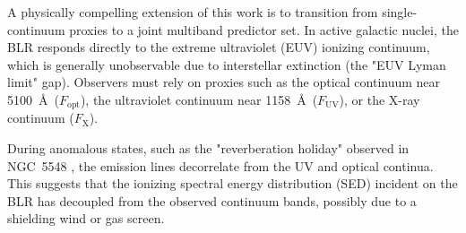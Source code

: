\documentclass[fleqn,usenatbib]{mnras}
\begin{document}
A physically compelling extension of this work is to transition from single-continuum proxies to a joint multiband predictor set. In active galactic nuclei, the BLR responds directly to the extreme ultraviolet (EUV) ionizing continuum, which is generally unobservable due to interstellar extinction (the "EUV Lyman limit" gap). Observers must rely on proxies such as the optical continuum near 5100~\AA\ ($F_{\mathrm{opt}}$), the ultraviolet continuum near 1158~\AA\ ($F_{\mathrm{UV}}$), or the X-ray continuum ($F_{\mathrm{X}}$).

During anomalous states, such as the "reverberation holiday" observed in NGC~5548 \cite{Dehghanian2019}, the emission lines decorrelate from the UV and optical continua. This suggests that the ionizing spectral energy distribution (SED) incident on the BLR has decoupled from the observed continuum bands, possibly due to a shielding wind or gas screen.
\end{document}
